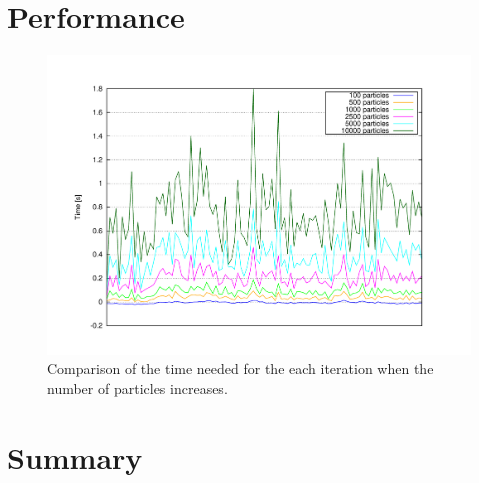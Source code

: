 \section{Performance}\label{ch:chapter05_02_04}
\begin{figure}[th]
  \centering
  \includegraphics[trim=50 50 90 60, clip]{timesVsParticles}
  \caption{Comparison of the time needed for the each iteration when the number of particles increases.}\label{fig:cp05_time_vs_particles}
\end{figure}

 
\section{Summary}\label{ch:chapter05_03}
 
% 
 
 
 
 